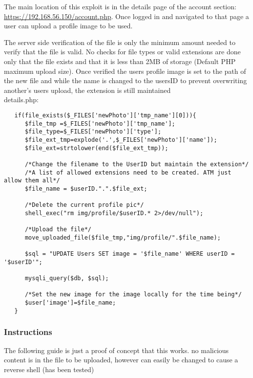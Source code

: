 \documentclass[titlepage]{article}
\begin{document}
      The main location of this exploit is in the details page of the account section: \url{https://192.168.56.150/account.php}. Once logged in and navigated to that page a user can upload a profile image to be used.

      The server side verification of the file is only the minimum amount needed to verify that the file is valid. No checks for file types or valid extensions are done only that the file exists and that it is less than 2MB of storage (Default PHP maximum upload size). Once verified the users profile image is set to the path of the new file and while the name is changed to the usersID to prevent overwriting another's users upload, the extension is still maintained\\ 

      details.php:

      \begin{lstlisting}
   if(file_exists($_FILES['newPhoto']['tmp_name'][0])){
      $file_tmp =$_FILES['newPhoto']['tmp_name'];
      $file_type=$_FILES['newPhoto']['type'];
      $file_ext_tmp=explode('.',$_FILES['newPhoto']['name']);
      $file_ext=strtolower(end($file_ext_tmp));

      /*Change the filename to the UserID but maintain the extension*/
      /*A list of allowed extensions need to be created. ATM just allow them all*/
      $file_name = $userID.".".$file_ext;         

      /*Delete the current profile pic*/
      shell_exec("rm img/profile/$userID.* 2>/dev/null");

      /*Upload the file*/
      move_uploaded_file($file_tmp,"img/profile/".$file_name);

      $sql = "UPDATE Users SET image = '$file_name' WHERE userID = '$userID'";

      mysqli_query($db, $sql);

      /*Set the new image for the image locally for the time being*/
      $user['image']=$file_name;
   }
      \end{lstlisting}


      \subsubsection{Instructions} %
      \label{ssub:unrestricted_file_upload_instructions}
      
      The following guide is just a proof of concept that this works. no malicious content is in the file to be uploaded, however can easily be changed to cause a reverse shell (has been tested)
\end{document}
